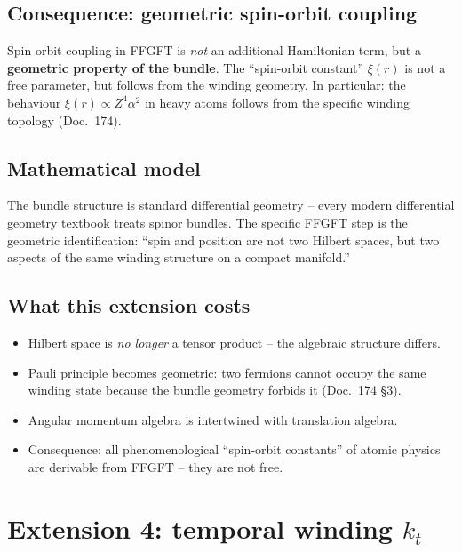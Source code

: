 \subsection{Consequence: geometric spin-orbit coupling}

Spin-orbit coupling in FFGFT is \emph{not} an additional Hamiltonian
term, but a \textbf{geometric property of the bundle}. The
\enquote{spin-orbit constant} $\xi(r)$ is not a free parameter, but
follows from the winding geometry. In particular: the behaviour
$\xi(r) \propto Z^4 \alpha^2$ in heavy atoms follows from the
specific winding topology (Doc.~174).

\subsection{Mathematical model}

The bundle structure is standard differential geometry -- every
modern differential geometry textbook treats spinor bundles. The
specific FFGFT step is the geometric identification:
\enquote{spin and position are not two Hilbert spaces, but two
aspects of the same winding structure on a compact manifold.}

\subsection{What this extension costs}

\begin{itemize}[leftmargin=2em,itemsep=2pt,topsep=2pt]
  \item Hilbert space is \emph{no longer} a tensor product -- the
        algebraic structure differs.
  \item Pauli principle becomes geometric: two fermions cannot
        occupy the same winding state because the bundle geometry
        forbids it (Doc.~174 §3).
  \item Angular momentum algebra is intertwined with translation
        algebra.
  \item Consequence: all phenomenological \enquote{spin-orbit
        constants} of atomic physics are derivable from FFGFT -- they
        are not free.
\end{itemize}

\section{\texorpdfstring{Extension 4: temporal winding $k_t$}{Extension 4: temporal winding k_t}}

